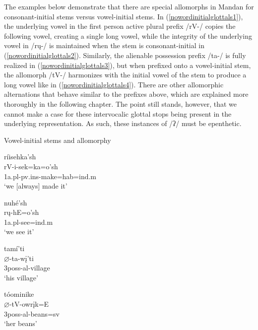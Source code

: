 The examples below demonstrate that there are special allomorphs in Mandan for consonant-initial stems versus vowel-initial stems. In (\ref{nowordinitialglottals1}), the underlying vowel in the first person active plural prefix /rV-/ copies the following vowel, creating a single long vowel, while the integrity of the underlying vowel in /rų-/ is maintained when the stem is consonant-initial in (\ref{nowordinitialglottals2}). Similarly, the alienable possession prefix /ta-/ is fully realized in (\ref{nowordinitialglottals3}), but when prefixed onto a vowel-initial stem, the allomorph /tV-/ harmonizes with the initial vowel of the stem to produce a long vowel like in (\ref{nowordinitialglottals4}). There are other allomorphic alternations that behave similar to the prefixes above, which are explained more thoroughly in the following chapter. The point still stands, however, that we cannot make a case for these intervocalic glottal stops being present in the underlying representation. As such, these instances of /ʔ/ must be epenthetic.


\begin{exe}

\item\label{nowordinitialglottals} Vowel-initial stems and allomorphy

\begin{xlist}

\item\label{nowordinitialglottals1}
\glll ríisehka'sh\\
	rV-i-sek=ka=o'sh\\
	1a.pl-pv.ins-\textnormal{make}=hab=ind.m\\
\glt	`we [always] made it' \citep[356]{lowie1913}

\item\label{nowordinitialglottals2}
\glll	nuhé'sh\\
	rų-hE=o'sh\\
	1a.pl-\textnormal{see}=ind.m\\
\glt `we see it' \citep[71]{hollow1970}

\item\label{nowordinitialglottals3}
\glll	tamí'ti\\
	$\varnothing$-ta-wį'ti\\
	3poss-al-\textnormal{village}\\
\glt	`his village' \citep[482]{hollow1970}

\item\label{nowordinitialglottals4}
\glll	tóominike\\
	$\varnothing$-tV-owrįk=E\\
	3poss-al-\textnormal{beans}=sv\\
\glt	`her beans' \citep[482]{hollow1970}

\end{xlist}

\end{exe}

